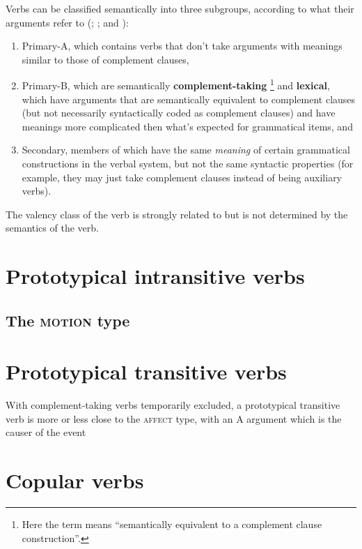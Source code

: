 \documentclass[a4paper, oneside, 12pt]{report}
\newcommand*{\citesec}[1]{\S~{#1}}
\newcommand*{\concept}[1]{\textbf{#1}}
\newcommand{\classify}[1]{{\textsc{#1}}}
\begin{document}
Verbs can be classified semantically into three subgroups,
according to what their arguments refer to
(\citealt[Part B]{dixon2005semantic};
\citealt[\citesec{18.5}]{dixon2010basic2};
and \citealt[\citesec{3.3}]{dixon2009basic1}):
\begin{enumerate}
    \item Primary-A, which contains verbs that 
    don't take arguments with meanings similar to those of complement clauses,
    \item Primary-B, which are semantically \concept{complement-taking}%
    \footnote{
        Here the term means ``semantically equivalent to a complement clause construction''.
    }
    and \concept{lexical},
    which have arguments that are semantically equivalent to complement clauses 
    (but not necessarily syntactically coded as complement clauses)
    and have meanings more complicated then what's expected for grammatical items, and 
    \item Secondary, members of which have the same \emph{meaning} 
    of certain grammatical constructions in the verbal system,
    but not the same syntactic properties
    (for example, they may just take complement clauses instead of being auxiliary verbs).
\end{enumerate}
The valency class of the verb is strongly related to but is not determined by the semantics of the verb.


\section{Prototypical intransitive verbs}\label{sec:prototypical-intransitive}

\subsection{The \classify{motion} type}


\section{Prototypical transitive verbs}\label{sec:prototypical-transitive}

With complement-taking verbs temporarily excluded,
a prototypical transitive verb is more or less close to the \classify{affect} type,
with an A argument which is the causer of the event 

\section{Copular verbs}
\end{document}
